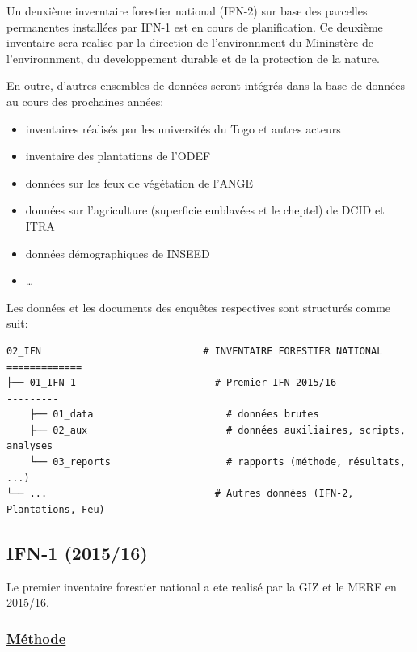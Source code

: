 \documentclass[a4paper, notitlepage, 12pt, krantz2]{krantz}
\makeatletter
\providecommand{\tightlist}{%
  \setlength{\itemsep}{0pt}\setlength{\parskip}{0pt}}
\newenvironment{kframe}{%
\medskip{}
\setlength{\fboxsep}{.8em}
 \def\at@end@of@kframe{}%
 \ifinner\ifhmode%
  \def\at@end@of@kframe{\end{minipage}}%
  \begin{minipage}{\columnwidth}%
 \fi\fi%
 \def\FrameCommand##1{\hskip\@totalleftmargin \hskip-\fboxsep
 \colorbox{shadecolor}{##1}\hskip-\fboxsep
     \hskip-\linewidth \hskip-\@totalleftmargin \hskip\columnwidth}%
 \MakeFramed {\advance\hsize-\width
   \@totalleftmargin\z@ \linewidth\hsize
   \@setminipage}}%
 {\par\unskip\endMakeFramed%
 \at@end@of@kframe}
\newenvironment{rmdblock}[1]
  {
  \begin{itemize}
  \renewcommand{\labelitemi}{
    \raisebox{-.7\height}[0pt][0pt]{
      {\setkeys{Gin}{width=3em,keepaspectratio}\texttt{[image: images/icons/\#1]}}
    }
  }
  \setlength{\fboxsep}{1em}
  \begin{kframe}
  \item
  }
  {
  \end{kframe}
  \end{itemize}
  }
\newenvironment{rmdtodo}
  {\begin{rmdblock}{todo}}
  {\end{rmdblock}}
\makeatother
\begin{document}
\begin{rmdtodo}
Un deuxième inverntaire forestier national (IFN-2) sur base des
parcelles permanentes installées par IFN-1 est en cours de
planification. Ce deuxième inventaire sera realise par la direction de
l'environnment du Mininstère de l'environnment, du developpement durable
et de la protection de la nature.

En outre, d'autres ensembles de données seront intégrés dans la base de
données au cours des prochaines années:

\begin{itemize}
\tightlist
\item
  inventaires réalisés par les universités du Togo et autres acteurs
\item
  inventaire des plantations de l'ODEF
\item
  données sur les feux de végétation de l'ANGE
\item
  données sur l'agriculture (superficie emblavées et le cheptel) de DCID
  et ITRA
\item
  données démographiques de INSEED
\item
  \ldots{}
\end{itemize}
\end{rmdtodo}

Les données et les documents des enquêtes respectives sont structurés comme suit:

\begin{verbatim}
02_IFN                            # INVENTAIRE FORESTIER NATIONAL =============
├── 01_IFN-1                        # Premier IFN 2015/16 ---------------------
    ├── 01_data                       # données brutes      
    ├── 02_aux                        # données auxiliaires, scripts, analyses
    └── 03_reports                    # rapports (méthode, résultats, ...)
└── ...                             # Autres données (IFN-2, Plantations, Feu)
\end{verbatim}

\hypertarget{IFN-1}{%
\subsection{IFN-1 (2015/16)}\label{IFN-1}}

Le premier inventaire forestier national a ete realisé par la GIZ et le MERF en 2015/16.

\hypertarget{methode}{%
\subsubsection{\texorpdfstring{\href{../02_IFN/01_IFN-1/03_docs/IFN-1_Togo_MERF_Methode_Draft.pdf}{Méthode}}{Méthode}}\label{methode}}
\end{document}
